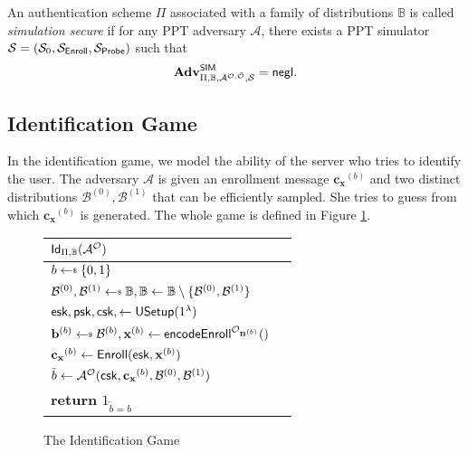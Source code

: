 An authentication scheme $\Pi$ associated with a family of distributions $\mathbb{B}$ is called \emph{simulation secure} if for any PPT adversary $\mathcal{A}$, there exists a PPT simulator $\mathcal{S} = (\mathcal{S}_0, \mathcal{S}_{\sf Enroll}, \mathcal{S}_{\sf Probe})$ such that
\[
	\mathbf{Adv}^{\sf SIM}_{\Pi, \mathbb{B}, \mathcal{A}^{\mathcal{O}, \tilde{\mathcal{O}}}, \mathcal{S}} = \mathsf{negl}.
\]


\subsection*{Identification Game}
\label{sec:id_game}

In the identification game, we model the ability of the server who tries to identify the user. The adversary $\mathcal{A}$ is given an enrollment message $\mathbf{c_x}^{(b)}$ and two distinct distributions $\mathcal{B}^{(0)}, \mathcal{B}^{(1)}$ that can be efficiently sampled. She tries to guess from which $\mathbf{c_x}^{(b)}$ is generated. The whole game is defined in Figure \ref{fig:id_game}.

\begin{figure}[h]
	\begin{center}
	\begin{tabular}{l c}
		${\sf Id}_{\Pi, \mathbb{B}}(\mathcal{A}^\mathcal{O})$\\

			\hline

			$b \getsdollar \{0, 1\}$ \\

			$\mathcal{B}^{(0)}, \mathcal{B}^{(1)} \getsdollar \mathbb{B}, \mathbb{B} \gets \mathbb{B} \setminus \{ \mathcal{B}^{(0)}, \mathcal{B}^{(1)} \}$ \\

			${\sf esk}, {\sf psk}, {\sf csk}, \gets {\sf USetup}(1^\lambda)$ \\

			$ \mathbf{b}^{(b)} \getsdollar \mathcal{B}^{(b)}, \mathbf{x}^{(b)} \gets {\sf encodeEnroll}^{\mathcal{O}_{\mathbf{B}^{(b)}}}()$ \\

			$\mathbf{c_x}^{(b)} \gets {\sf Enroll}({\sf esk}, \mathbf{x}^{(b)})$ \\

			$\tilde{b} \gets \mathcal{A}^{\mathcal{O}} ( {\sf csk}, \mathbf{c_x}^{(b)}, \mathcal{B}^{(0)}, \mathcal{B}^{(1)} )$ \\

			\textbf{return} $1_{\tilde{b} = b}$
			
	\end{tabular}
	\end{center}
	\caption{The Identification Game}
	\label{fig:id_game}
\end{figure}


